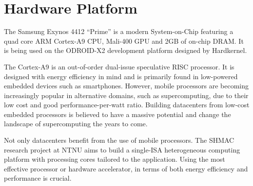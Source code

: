 \section{Hardware Platform}

The Samsung Exynos 4412 ``Prime'' is a modern System-on-Chip featuring a quad
core ARM Cortex-A9 CPU, Mali-400 GPU and 2GB of on-chip DRAM. It is being used
on the ODROID-X2 development platform designed by Hardkernel.

The Cortex-A9 is an out-of-order dual-issue speculative RISC processor. It is
designed with energy efficiency in mind and is primarily found in low-powered
embedded devices such as smartphones. However, mobile processors are becoming
increasingly popular in alternative domains, such as supercomputing, due to
their low cost and good performance-per-watt ratio. Building datacenters from
low-cost embedded processors is believed to have a massive potential and change
the landscape of supercomputing the years to come.

Not only datacenters benefit from the use of mobile processors. The SHMAC
research project at NTNU aims to build a single-ISA heterogeneous computing
platform with processing cores tailored to the application. Using the most
effective processor or hardware accelerator, in terms of both energy efficiency
and performance is crucial.
